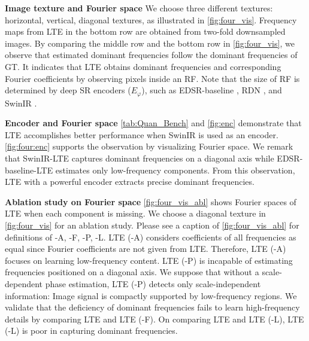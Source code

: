 \documentclass[10pt,twocolumn,letterpaper]{article}
\begin{document}
\textbf{Image texture and Fourier space} We choose three different textures: horizontal, vertical, diagonal textures, as illustrated in \cref{fig:four_vis}. Frequency maps from LTE in the bottom row are obtained from two-fold downsampled images. By comparing the middle row and the bottom row in \cref{fig:four_vis}, we observe that estimated dominant frequencies follow the dominant frequencies of GT. It indicates that LTE obtains dominant frequencies and corresponding Fourier coefficients by observing pixels inside an RF. Note that the size of RF is determined by deep SR encoders ($E_\varphi$), such as EDSR-baseline \cite{Lim_2017_CVPR_Workshops}, RDN \cite{zhang2018residual}, and SwinIR \cite{liang2021swinir}.

\textbf{Encoder and Fourier space} \cref{tab:Quan_Bench} and \cref{fig:enc} demonstrate that LTE accomplishes better performance when SwinIR \cite{liang2021swinir} is used as an encoder. \cref{fig:four:enc} supports the observation by visualizing Fourier space. We remark that SwinIR-LTE captures dominant frequencies on a diagonal axis while EDSR-baseline-LTE estimates only low-frequency components. From this observation,  LTE with a powerful encoder extracts precise dominant frequencies.

\textbf{Ablation study on Fourier space} \cref{fig:four_vis_abl} shows Fourier spaces of LTE when each component is missing. We choose a diagonal texture in \cref{fig:four_vis} for an ablation study. Please see a caption of \cref{fig:four_vis_abl} for definitions of -A, -F, -P, -L. LTE (-A) considers coefficients of all frequencies as equal since Fourier coefficients are not given from LTE. Therefore, LTE (-A) focuses on learning low-frequency content. LTE (-P) is incapable of estimating frequencies positioned on a diagonal axis. We suppose that without a scale-dependent phase estimation, LTE (-P) detects only scale-independent information: Image signal is compactly supported by low-frequency regions. We validate that the deficiency of dominant frequencies fails to learn high-frequency details by comparing LTE and LTE (-F). On comparing LTE and LTE (-L), LTE (-L) is poor in capturing dominant frequencies.
\end{document}
